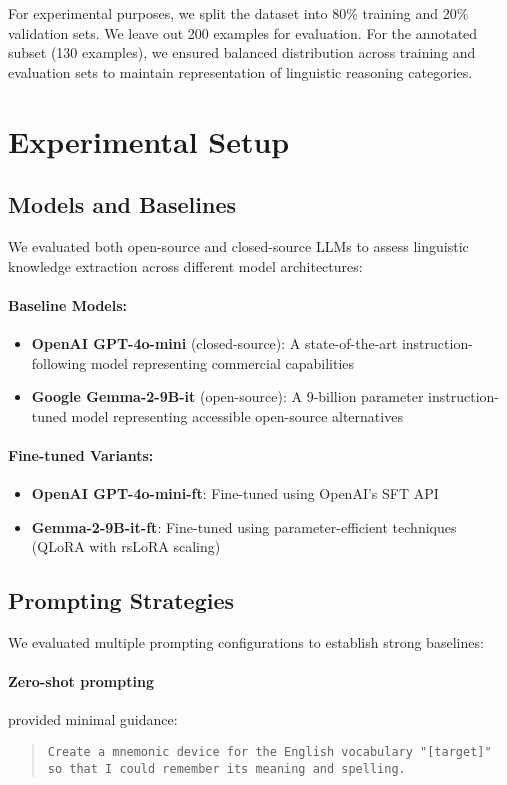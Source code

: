 \documentclass{article}
\newcounter{para}
\begin{document}
For experimental purposes, we split the dataset into 80\% training and 20\% validation sets. We leave out 200 examples for evaluation.
For the annotated subset (130 examples), we ensured balanced distribution across training and evaluation sets to maintain representation of linguistic reasoning categories.

\section{Experimental Setup} \label{sec:experiments}
\subsection{Models and Baselines} \label{sec:models}
We evaluated both open-source and closed-source LLMs to assess linguistic knowledge extraction across different model architectures:
\paragraph{Baseline Models:}
\begin{itemize}
\item \textbf{OpenAI GPT-4o-mini} (closed-source): A state-of-the-art instruction-following model representing commercial capabilities
\item \textbf{Google Gemma-2-9B-it} (open-source): A 9-billion parameter instruction-tuned model representing accessible open-source alternatives
\end{itemize}
\paragraph{Fine-tuned Variants:}
\begin{itemize}
\item \textbf{OpenAI GPT-4o-mini-ft}: Fine-tuned using OpenAI's SFT API
\item \textbf{Gemma-2-9B-it-ft}: Fine-tuned using parameter-efficient techniques (QLoRA with rsLoRA scaling)
\end{itemize}

\subsection{Prompting Strategies} \label{sec:prompting}
We evaluated multiple prompting configurations to establish strong baselines:
\paragraph{Zero-shot prompting} provided minimal guidance:
\begin{quote}
\texttt{Create a mnemonic device for the English vocabulary "[target]" so that I could remember its meaning and spelling.}
\end{quote}
\end{document}
